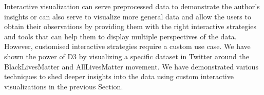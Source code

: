 Interactive visualization can serve preprocessed data to demonstrate the author's insights or can also serve to visualize more general data and allow the users to obtain their observations by providing them with the right interactive strategies and tools that can help them to display multiple perspectives of the data. However, customised interactive strategies require a custom use case. We have shown the power of D3 by visualizing a specific dataset in Twitter around the BlackLivesMatter and AllLivesMatter movement. We have demonstrated various techniques to shed deeper insights into the data using custom interactive visualizations in the previous Section.